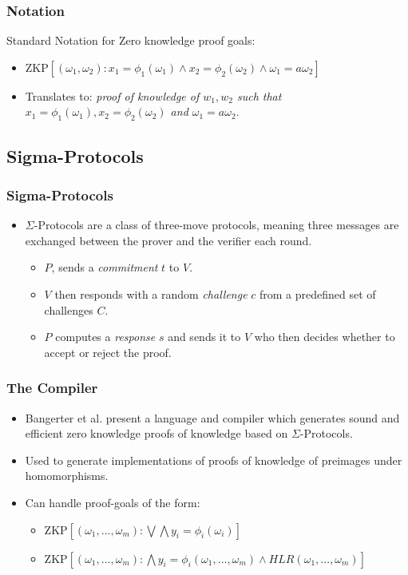 \documentclass{beamer}
\begin{document}
\begin{frame}
	\frametitle{Notation}
	Standard Notation for Zero knowledge proof goals:
	\begin{itemize}
		\item $\text{ZKP}[(\omega_{1},\omega_{2}):x_{1} = \phi_{1}(\omega_{1}) \land  x_{2} = \phi_{2}(\omega_{2}) \land \omega_{1} = a\omega_{2}]$ 
		
		\item Translates to: \textit{proof of knowledge of $w_{1}, w_{2}$ such that 
	$x_{1} = \phi_{1}(\omega_{1}), x_{2} = \phi_{2}(\omega_{2})$ and $\omega_{1} = a\omega_{2}$}.
	\end{itemize}
\end{frame}

\subsection{Sigma-Protocols}

\begin{frame}
	\frametitle{Sigma-Protocols}
	\begin{itemize}	
		\item $\Sigma$-Protocols are a class of
		three-move protocols, meaning three messages are exchanged between the prover
		and the verifier each round.
		
		\begin{itemize}
			\item $P$, sends a \textit{commitment} $t$ to $V$.
			\item $V$ then responds with a random \textit{challenge} $c$ from a 
			predefined set of challenges $C$.
			\item $P$ computes a \textit{response} $s$ and sends
			it to $V$ who then decides whether to accept or reject the proof.
		\end{itemize}
	\end{itemize}
\end{frame}

\begin{frame}
	\frametitle{The Compiler}
	\begin{itemize}
		\item Bangerter et al. present a language and compiler
		which generates sound and efficient zero knowledge proofs of knowledge
		based on $\Sigma$-Protocols.	
		
		\item Used to generate implementations of proofs
		of knowledge of preimages under homomorphisms.
		
		\item Can handle proof-goals of the form:
		\begin{itemize}
			\item $\text{ZKP}[(\omega_{1},...,\omega_{m}):\bigvee\bigwedge y_{i} = \phi_{i}(\omega_{i})]$
			\item $\text{ZKP}[(\omega_{1},...,\omega_{m}):\bigwedge y_{i} = \phi_{i}(\omega_{1},...,\omega_{m})\land HLR(\omega_{1},...,\omega_{m})]$
		\end{itemize}
	\end{itemize}
\end{frame}
\end{document}
